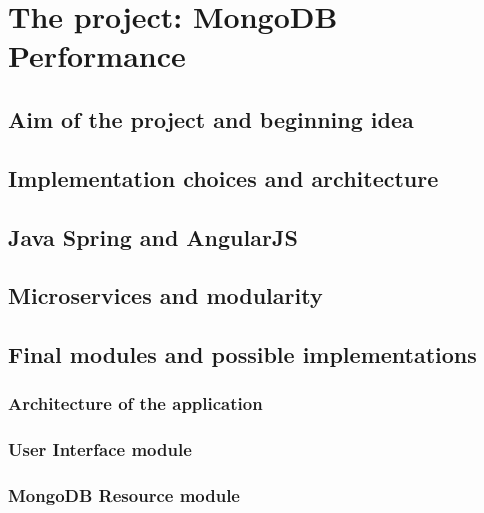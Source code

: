 \chapter{The project: MongoDB Performance}
\label{cha:3}

\section{Aim of the project and beginning idea}
\label{sec:1}

\section{Implementation choices and architecture}
\label{sec:2}

\section{Java Spring and AngularJS}
\label{sec:3}

\section{Microservices and modularity}
\label{sec:4}

\section{Final modules and possible implementations}
\label{sec:5}

\subsection{Architecture of the application}

\subsection{User Interface module}

\subsection{MongoDB Resource module}